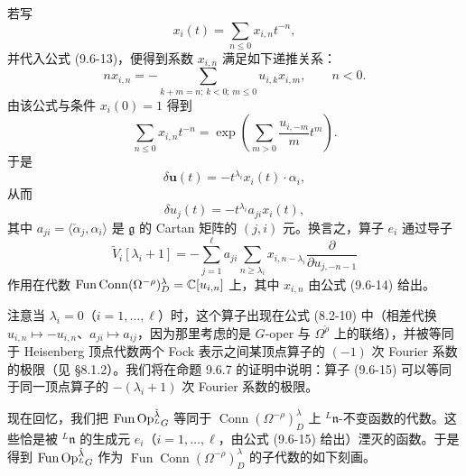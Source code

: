 若写
\[
    x_i(t)=\sum_{n\le0}x_{i,n}t^{-n},
\]
并代入公式 (9.6-13)，便得到系数 $x_{i,n}$ 满足如下递推关系：
\[
    n x_{i,n}=-\sum_{k+m=n;\,k<0;\,m\le0}u_{i,k}x_{i,m},
    \qquad n<0.
\]
由该公式与条件 $x_i(0)=1$ 得到
\begin{equation}
    \sum_{n\le0}x_{i,n}t^{-n}
    =\exp\left(\sum_{m>0}\frac{u_{i,-m}}{m}t^m\right).
    \tag{9.6-14}
\end{equation}
于是
\[
    \delta\mathbf{u}(t)=-t^{\lambda_i}x_i(t)\cdot\alpha_i,
\]
从而
\[
    \delta u_j(t)=-t^{\lambda_i}a_{ji}x_i(t),
\]
其中 $a_{ji}=\langle\check\alpha_j,\alpha_i\rangle$ 是 $\mathfrak{g}$ 的 Cartan 矩阵的 $(j,i)$ 元。换言之，算子 $e_i$ 通过导子
\begin{equation}
    \widetilde{V}_i[\lambda_i+1]
    =-\sum_{j=1}^{\ell}a_{ji}\sum_{n\ge\lambda_i}x_{i,n-\lambda_i}
    \frac{\partial}{\partial u_{j,-n-1}}
    \tag{9.6-15}
\end{equation}
作用在代数 $\operatorname{Fun}\operatorname{Conn}(\Omega^{-\rho})^\lambda_D=\mathbb{C}[u_{i,n}]$ 上，其中 $x_{i,n}$ 由公式 (9.6-14) 给出。

注意当 $\lambda_i=0$（$i=1,\dots,\ell$）时，这个算子出现在公式 (8.2-10) 中（相差代换 $u_{i,n}\mapsto-u_{i,n}$、$a_{ji}\mapsto a_{ij}$，因为那里考虑的是 $G$-oper 与 $\Omega^{\check\rho}$ 上的联络），并被等同于 Heisenberg 顶点代数两个 Fock 表示之间某顶点算子的 $(-1)$ 次 Fourier 系数的极限（见 §8.1.2）。我们将在命题 9.6.7 的证明中说明：算子 (9.6-15) 可以等同于同一顶点算子的 $-\!(\lambda_i+1)$ 次 Fourier 系数的极限。

现在回忆，我们把 $\operatorname{Fun}\operatorname{Op}^{\check\lambda}_{{}^LG}$ 等同于 $\operatorname{Conn}(\Omega^{-\rho})^\lambda_D$ 上 ${}^L\mathfrak{n}$-不变函数的代数。这些恰是被 ${}^L\mathfrak{n}$ 的生成元 $e_i$（$i=1,\dots,\ell$，由公式 (9.6-15) 给出）湮灭的函数。于是得到 $\operatorname{Fun}\operatorname{Op}^{\check\lambda}_{{}^LG}$ 作为 $\operatorname{Fun}\operatorname{Conn}(\Omega^{-\rho})^\lambda_D$ 的子代数的如下刻画。

